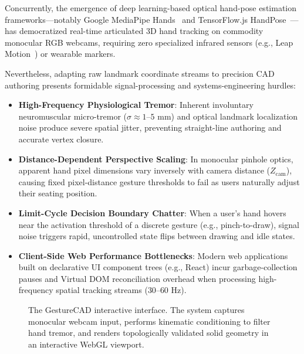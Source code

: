 Concurrently, the emergence of deep learning-based optical hand-pose estimation frameworks---notably Google MediaPipe Hands~\cite{zhang2020mediapipe,lugaresi2019mediapipe} and TensorFlow.js HandPose~\cite{ACP2020handpose}---has democratized real-time articulated 3D hand tracking on commodity monocular RGB webcams, requiring zero specialized infrared sensors (e.g., Leap Motion~\cite{leapmotion2013}) or wearable markers. 

Nevertheless, adapting raw landmark coordinate streams to precision CAD authoring presents formidable signal-processing and systems-engineering hurdles:
\begin{itemize}
    \item \textbf{High-Frequency Physiological Tremor}: Inherent involuntary neuromuscular micro-tremor ($\sigma \approx 1$--$5\text{ mm}$) and optical landmark localization noise produce severe spatial jitter, preventing straight-line authoring and accurate vertex closure.
    \item \textbf{Distance-Dependent Perspective Scaling}: In monocular pinhole optics, apparent hand pixel dimensions vary inversely with camera distance ($Z_{\text{cam}}$), causing fixed pixel-distance gesture thresholds to fail as users naturally adjust their seating position.
    \item \textbf{Limit-Cycle Decision Boundary Chatter}: When a user's hand hovers near the activation threshold of a discrete gesture (e.g., pinch-to-draw), signal noise triggers rapid, uncontrolled state flips between drawing and idle states.
    \item \textbf{Client-Side Web Performance Bottlenecks}: Modern web applications built on declarative UI component trees (e.g., React) incur garbage-collection pauses and Virtual DOM reconciliation overhead when processing high-frequency spatial tracking streams ($30$--$60\text{ Hz}$).
\end{itemize}

\begin{figure}[t]
    \centering
    \caption{The GestureCAD interactive interface. The system captures monocular webcam input, performs kinematic conditioning to filter hand tremor, and renders topologically validated solid geometry in an interactive WebGL viewport.}
    \label{fig:overview}
\end{figure}

